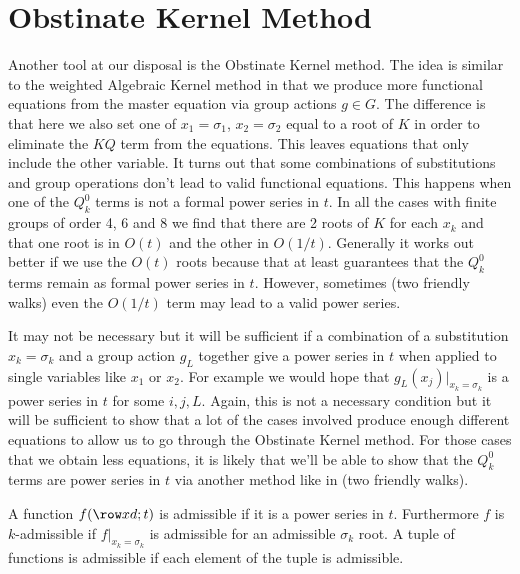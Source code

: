 
\chapter{Obstinate Kernel Method}
\label{ch:OKM}

Another tool at our disposal is the Obstinate Kernel method. The idea is similar to the weighted Algebraic Kernel method in that we produce more functional equations from the master equation via group actions $g \in G$. The difference is that here we also set one of $x_1 = \sigma_1$, $x_2 = \sigma_2$ equal to a root of $K$ in order to eliminate the $KQ$ term from the equations. This leaves equations that only include the other variable. It turns out that some combinations of substitutions and group operations don't lead to valid functional equations. This happens when one of the $Q_k^0$ terms is not a formal power series in $t$. In all the cases with finite groups of order 4, 6 and 8 we find that there are 2 roots of $K$ for each $x_k$ and that one root is in $O(t)$ and the other in $O(1/t)$. Generally it works out better if we use the $O(t)$ roots because that at least guarantees that the $Q_k^0$ terms remain as formal power series in $t$. However, sometimes (two friendly walks) even the $O(1/t)$ term may lead to a valid power series. 

It may not be necessary but it will be sufficient if a combination of a substitution $x_k = \sigma_k$ and a group action $g_L$ together give a power series in $t$ when applied to single variables like $x_1$ or $x_2$. For example we would hope that $g_L(x_j)|_{x_k=\sigma_k}$ is a power series in $t$ for some $i,j,L$. Again, this is not a necessary condition but it will be sufficient to show that a lot of the cases involved produce enough different equations to allow us to go through the Obstinate Kernel method. For those cases that we obtain less equations, it is likely that we'll be able to show that the $Q_k^0$ terms are power series in $t$ via another method like in (two friendly walks).

\begin{definition} A function $f(\row xd;t)$ is admissible if it is a power series in $t$. Furthermore $f$ is $k$-admissible if $f|_{x_k=\sigma_k}$ is admissible for an admissible $\sigma_k$ root. A tuple of functions is admissible if each element of the tuple is admissible.
\end{definition}


